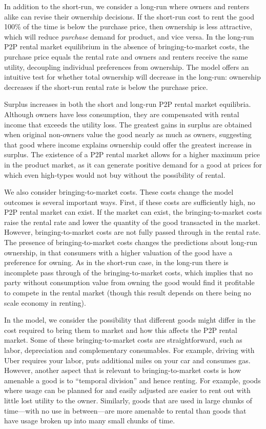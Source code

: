 \documentclass[11pt]{article}
\begin{document}
In addition to the short-run, we consider a long-run where owners and renters alike can revise their ownership decisions. 
If the short-run cost to rent the good 100\% of the time is below the purchase price, then ownership is less attractive, which will reduce \emph{purchase} demand for product, and vice versa. 
In the long-run P2P rental market equilibrium in the absence of bringing-to-market costs, the purchase price equals the rental rate and owners and renters receive the same utility, decoupling individual preferences from ownership. 
The model offers an intuitive test for whether total ownership will decrease in the long-run:
ownership decreases if the short-run rental rate is below the purchase price. 

Surplus increases in both the short and long-run P2P rental market equilibria.
Although owners have less consumption, they are compensated with rental income that exceeds the utility loss. 
The greatest gains in surplus are obtained when original non-owners value the good nearly as much as owners, suggesting that good where income explains ownership could offer the greatest increase in surplus. 
The existence of a P2P rental market allows for a higher maximum price in the product market, as it can generate positive demand for a good at prices for which even high-types would not buy without the possibility of rental. 

We also consider bringing-to-market costs.
These costs change the model outcomes is several important ways.
First, if these costs are sufficiently high, no P2P rental market can exist.
If the market can exist, the bringing-to-market costs raise the rental rate and lower the quantity of the good transacted in the market.
However, bringing-to-market costs are not fully passed through in the rental rate.
The presence of bringing-to-market costs changes the predictions about long-run ownership, in that consumers with a higher valuation of the good have a preference for owning.
As in the short-run case, in the long-run there is incomplete pass through of the bringing-to-market costs, which implies that no party without consumption value from owning the good would find it profitable to compete in the rental market (though this result depends on there being no scale economy in renting). 

In the model, we consider the possibility that different goods might differ in the cost required to bring them to market and how this affects the P2P rental market. 
Some of these bringing-to-market costs are straightforward, such as labor, depreciation and complementary consumables.
For example, driving with Uber requires your labor, puts additional miles on your car and consumes gas.
However, another aspect that is relevant to bringing-to-market costs is how amenable a good is to ``temporal division'' and hence renting.
For example, goods where usage can be planned for and easily adjusted are easier to rent out with little lost utility to the owner. 
Similarly, goods that are used in large chunks of time---with no use in between---are more amenable to rental than goods that have usage broken up into many small chunks of time.
\end{document}
